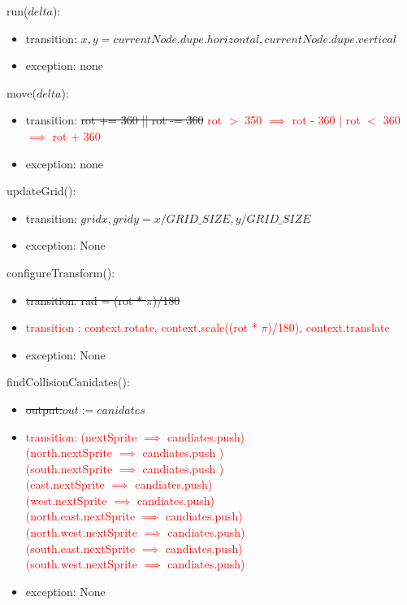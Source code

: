\documentclass[12pt]{article}
\begin{document}
\noindent run($delta$):
\begin{itemize}
\item transition: $x,y = currentNode.dupe.horizontal, currentNode.dupe.vertical$
\item exception: none
\end{itemize}

\noindent move($delta$):
\begin{itemize}
\item transition: \sout{rot += 360 || rot -= 360} \textcolor{red}{ rot $>$ 350 $\implies$ rot - 360 | rot $<$ 360 $\implies$ rot + 360}
\item exception: none
\end{itemize}

\noindent updateGrid():
\begin{itemize}
\item transition: $gridx, gridy = x / GRID\_SIZE, y / GRID\_SIZE$
\item exception: None
\end{itemize}

\noindent configureTransform():
\begin{itemize}
\item \sout{transition: rad = (rot * $\pi$)/180}
\item \textcolor{red}{transition : context.rotate, context.scale((rot * $\pi$)/180), context.translate}
\item exception: None
\end{itemize}

\noindent findCollisionCanidates():
\begin{itemize}
\item \sout{output:$out := canidates$}
\item \textcolor{red}{transition: (nextSprite $\implies$ candiates.push) \\
						  (north.nextSprite $\implies$ candiates.push )\\
						  (south.nextSprite $\implies$ candiates.push )\\
						  (east.nextSprite $\implies$ candiates.push)\\
						  (west.nextSprite $\implies$ candiates.push)\\
                                  (north.east.nextSprite $\implies$ candiates.push)\\
					       (north.west.nextSprite $\implies$ candiates.push)\\
						  (south.east.nextSprite $\implies$ candiates.push)\\
    						  (south.west.nextSprite $\implies$ candiates.push)}\\

\item exception: None
\end{itemize}
\end{document}
